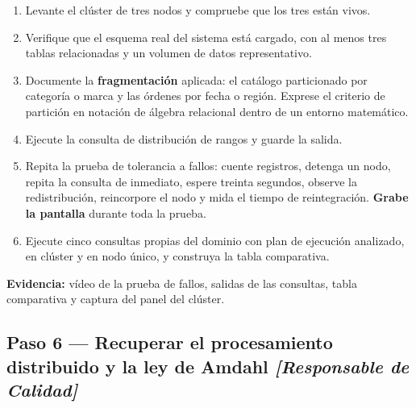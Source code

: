 \documentclass[11pt,a4paper]{article}
\newcommand{\paso}[1]{\subsection{#1}}
\begin{document}
	\begin{enumerate}[leftmargin=*,itemsep=4pt]
		\item Levante el clúster de tres nodos y compruebe que los tres están vivos.
		\item Verifique que el esquema real del sistema está cargado, con al menos tres tablas relacionadas y un volumen de datos representativo.
		\item Documente la \textbf{fragmentación} aplicada: el catálogo particionado por categoría o marca y las órdenes por fecha o región. Exprese el criterio de partición en notación de álgebra relacional dentro de un entorno matemático.
		\item Ejecute la consulta de distribución de rangos y guarde la salida.
		\item Repita la prueba de tolerancia a fallos: cuente registros, detenga un nodo, repita la consulta de inmediato, espere treinta segundos, observe la redistribución, reincorpore el nodo y mida el tiempo de reintegración. \textbf{Grabe la pantalla} durante toda la prueba.
		\item Ejecute cinco consultas propias del dominio con plan de ejecución analizado, en clúster y en nodo único, y construya la tabla comparativa.
	\end{enumerate}
	
	\textbf{Evidencia:} vídeo de la prueba de fallos, salidas de las consultas, tabla comparativa y captura del panel del clúster.
	
	\paso{Paso 6 --- Recuperar el procesamiento distribuido y la ley de Amdahl \emph{[Responsable de Calidad]}}
	
\end{document}
